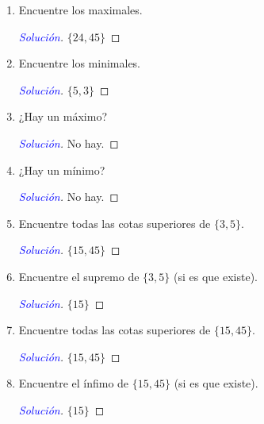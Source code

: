 \documentclass[a4paper,12pt]{article}
\newenvironment{solution}
  {\renewcommand\qedsymbol{$\square$}\begin{proof}[\textcolor{blue}{Solución}]}
  {\end{proof}}
\begin{document}
\begin{enumerate}
    \item  Encuentre los maximales.
    \begin{solution}
    $\{24,45\}$
    \end{solution}
    \item  Encuentre los minimales.
    \begin{solution}
    $\{5,3\}$
    \end{solution}
    \item  ¿Hay un máximo?
    \begin{solution}
    No hay.
    \end{solution}
    \item ¿Hay un mínimo?
    \begin{solution}
    No hay.
    \end{solution}
    \item  Encuentre todas las cotas superiores de $\{3,5\}$.
    \begin{solution}
    $\{15,45\}$
    \end{solution}
    \item  Encuentre el supremo de $\{3,5\}$ (si es que existe).
    \begin{solution}
    $\{15\}$
    \end{solution}
    \item  Encuentre todas las cotas superiores de $\{15,45\}$.
    \begin{solution}
    $\{15,45\}$ 
    \end{solution}
    \item Encuentre el ínfimo de $\{15,45\}$ (si es que existe).
    \begin{solution}
    $\{15\}$
    \end{solution}
\end{enumerate}

%
%
\end{document}
